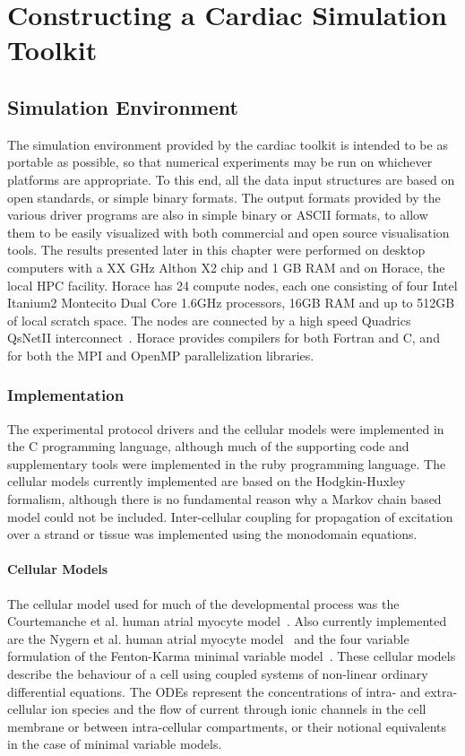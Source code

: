 \chapter{Constructing a Cardiac Simulation Toolkit}

\section{Simulation Environment}

The simulation environment provided by the cardiac toolkit is intended to be as
portable as possible, so that numerical experiments may be run on whichever
platforms are appropriate.  To this end, all the data input structures are based
on open standards, or simple binary formats.  The output formats provided by the
various driver programs are also in simple binary or ASCII formats, to allow
them to be easily visualized with both commercial and open source visualisation
tools.  The results presented later in this chapter were performed on desktop
computers with a XX GHz Althon X2 chip and 1 GB RAM and on Horace, the local HPC
facility.  Horace has 24 compute nodes, each one consisting of four Intel Itanium2
Montecito Dual Core 1.6GHz processors, 16GB RAM and up to 512GB of local scratch
space.  The nodes are connected by a high speed Quadrics QsNetII
interconnect~\cite{horace}.  Horace provides compilers for both Fortran and C,
and for both the MPI and OpenMP parallelization libraries.

\subsection{Implementation}

The experimental protocol drivers and the cellular models were implemented in
the C programming language, although much of the supporting code and
supplementary tools were implemented in the ruby programming language.  The
cellular models currently implemented are based on the Hodgkin-Huxley formalism,
although there is no fundamental reason why a Markov chain based model could not
be included.  Inter-cellular coupling for propagation of excitation over a
strand or tissue was implemented using the monodomain equations.

\subsubsection{Cellular Models}

The cellular model used for much of the developmental process was the
Courtemanche et al. human atrial myocyte model~\cite{crn98}.  Also currently
implemented are the Nygern et al. human atrial myocyte model~\cite{nygern98} and
the four variable formulation of the Fenton-Karma minimal variable
model~\cite{overo2008}.  These cellular models describe the behaviour of a cell
using coupled systems of non-linear ordinary differential equations.  The ODEs
represent the concentrations of intra- and extra-cellular ion species and the
flow of current through ionic channels in the cell membrane or between
intra-cellular compartments, or their notional equivalents in the case of minimal
variable models.

